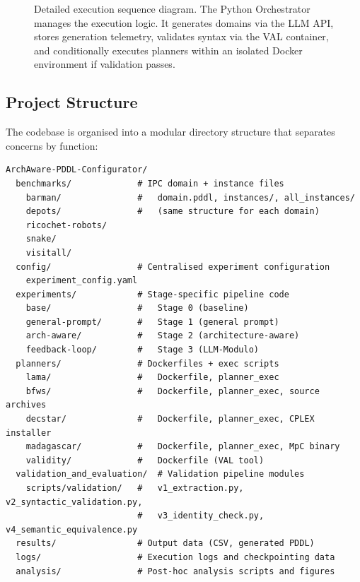 \begin{figure}[htbp]
{\begin{tikzpicture}
  \end{tikzpicture}
  }
  \caption[Detailed execution sequence diagram.]{Detailed execution sequence diagram. The Python Orchestrator manages the execution logic. It generates domains via the LLM API, stores generation telemetry, validates syntax via the VAL container, and conditionally executes planners within an isolated Docker environment if validation passes.}
  \label{fig:system_sequence}
\end{figure}

\clearpage

\subsection{Project Structure}
\label{sec:impl:codebase:structure}

The codebase is organised into a modular directory structure that separates concerns by function:

\begin{lstlisting}[language={}, caption={Top-level directory structure of the project.}, label={lst:dir_structure}, basicstyle=\footnotesize\ttfamily, numbers=none, frame=single, xleftmargin=0.5cm, xrightmargin=0.5cm, breaklines=true]
ArchAware-PDDL-Configurator/
  benchmarks/             # IPC domain + instance files
    barman/               #   domain.pddl, instances/, all_instances/
    depots/               #   (same structure for each domain)
    ricochet-robots/
    snake/
    visitall/
  config/                 # Centralised experiment configuration
    experiment_config.yaml
  experiments/            # Stage-specific pipeline code
    base/                 #   Stage 0 (baseline)
    general-prompt/       #   Stage 1 (general prompt)
    arch-aware/           #   Stage 2 (architecture-aware)
    feedback-loop/        #   Stage 3 (LLM-Modulo)
  planners/               # Dockerfiles + exec scripts
    lama/                 #   Dockerfile, planner_exec
    bfws/                 #   Dockerfile, planner_exec, source archives
    decstar/              #   Dockerfile, planner_exec, CPLEX installer
    madagascar/           #   Dockerfile, planner_exec, MpC binary
    validity/             #   Dockerfile (VAL tool)
  validation_and_evaluation/  # Validation pipeline modules
    scripts/validation/   #   v1_extraction.py, v2_syntactic_validation.py,
                          #   v3_identity_check.py, v4_semantic_equivalence.py
  results/                # Output data (CSV, generated PDDL)
  logs/                   # Execution logs and checkpointing data
  analysis/               # Post-hoc analysis scripts and figures
\end{lstlisting}


